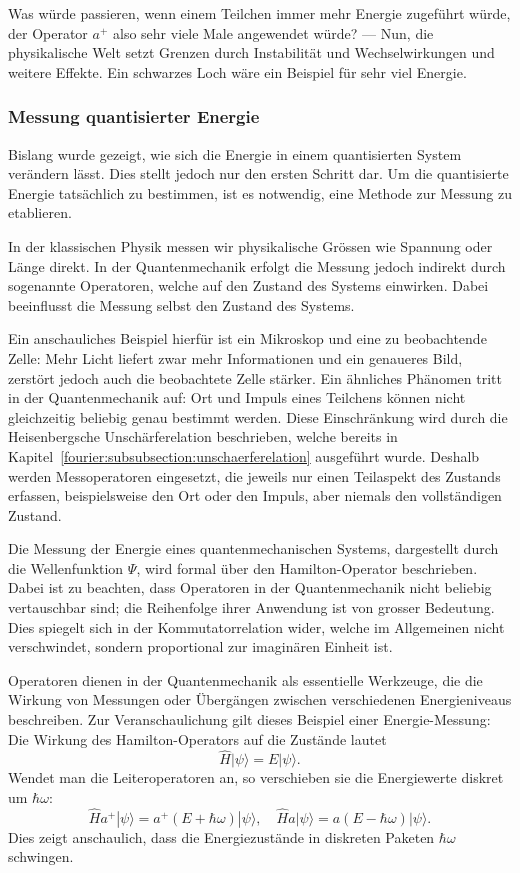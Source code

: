 			Was würde passieren, wenn einem Teilchen immer mehr Energie zugeführt würde, der Operator $a^+$ also sehr viele Male angewendet würde? ---
			Nun, die physikalische Welt setzt Grenzen durch Instabilität und Wechselwirkungen und weitere Effekte.
			Ein schwarzes Loch wäre ein Beispiel für sehr viel Energie.
		
		\subsubsection{Messung quantisierter Energie\label{fourier:subsubsection:MessungQuantisierterEnergie}}
			Bislang wurde gezeigt, wie sich die Energie in einem quantisierten System verändern lässt.
			Dies stellt jedoch nur den ersten Schritt dar.
			Um die quantisierte Energie tatsächlich zu bestimmen, ist es notwendig, eine Methode zur Messung zu etablieren.

			In der klassischen Physik messen wir physikalische Grössen wie Spannung oder Länge direkt.
			In der Quantenmechanik erfolgt die Messung jedoch indirekt durch sogenannte Operatoren, welche auf den Zustand des Systems einwirken.
			Dabei beeinflusst die Messung selbst den Zustand des Systems.

			Ein anschauliches Beispiel hierfür ist ein Mikroskop und eine zu beobachtende Zelle:
			Mehr Licht liefert zwar mehr Informationen und ein genaueres Bild, zerstört jedoch auch die beobachtete Zelle stärker.
			Ein ähnliches Phänomen tritt in der Quantenmechanik auf:
			Ort und Impuls eines Teilchens können nicht gleichzeitig beliebig genau bestimmt werden.
			Diese Einschränkung wird durch die Heisenbergsche Unschärferelation beschrieben, welche bereits in Kapitel~\ref{fourier:subsubsection:unschaerferelation} ausgeführt wurde.
			Deshalb werden Messoperatoren eingesetzt, die jeweils nur einen Teilaspekt des Zustands erfassen, beispielsweise den Ort oder den Impuls, aber niemals den vollständigen Zustand.

			Die Messung der Energie eines quantenmechanischen Systems, dargestellt durch die Wellenfunktion \(\Psi\), wird formal über den Hamilton-Operator beschrieben.
			Dabei ist zu beachten, dass Operatoren in der Quantenmechanik nicht beliebig vertauschbar sind; die Reihenfolge ihrer Anwendung ist von grosser Bedeutung.
			Dies spiegelt sich in der Kommutatorrelation wider, welche im Allgemeinen nicht verschwindet, sondern proportional zur imaginären Einheit ist.

			Operatoren dienen in der Quantenmechanik als essentielle Werkzeuge, die die Wirkung von Messungen oder Übergängen zwischen verschiedenen Energieniveaus beschreiben.
			Zur Veranschaulichung gilt dieses Beispiel einer Energie-Messung:
			Die Wirkung des Hamilton-Operators auf die Zustände lautet
			\[
				\hat{H} |\psi\rangle = E |\psi\rangle.
			\]
			Wendet man die Leiteroperatoren an, so verschieben sie die Energiewerte diskret um $\hbar \omega$:
			\[
				\hat{H} a^+ |\psi\rangle = a^+ (E + \hbar \omega) |\psi\rangle,
				\quad
				\hat{H} a |\psi\rangle = a (E - \hbar \omega) |\psi\rangle.
			\]
			Dies zeigt anschaulich, dass die Energiezustände in diskreten Paketen $\hbar \omega$ schwingen.

